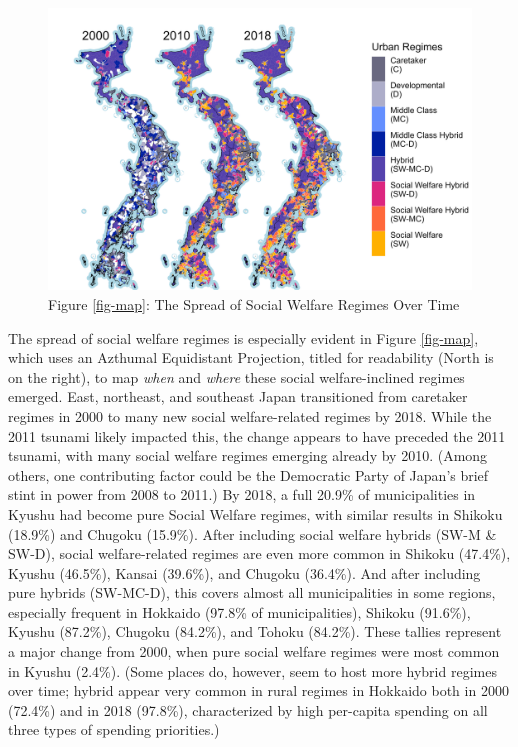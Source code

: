 \documentclass[preprint, 3p,
authoryear]{elsarticle} %
\begin{document}
\begin{figure}
\includegraphics[width=1\linewidth]{../viz/map_categories_3b} \caption{Figure \ref{fig-map}\label{fig-map}: The Spread of Social Welfare Regimes Over Time}\label{fig:map}
\end{figure}

The spread of social welfare regimes is especially evident in Figure
\ref{fig-map}, which uses an Azthumal Equidistant Projection, titled for
readability (North is on the right), to map \emph{when} and \emph{where}
these social welfare-inclined regimes emerged. East, northeast, and
southeast Japan transitioned from caretaker regimes in 2000 to many new
social welfare-related regimes by 2018. While the 2011 tsunami likely
impacted this, the change appears to have preceded the 2011 tsunami,
with many social welfare regimes emerging already by 2010. (Among
others, one contributing factor could be the Democratic Party of Japan's
brief stint in power from 2008 to 2011.) By 2018, a full 20.9\% of
municipalities in Kyushu had become pure Social Welfare regimes, with
similar results in Shikoku (18.9\%) and Chugoku (15.9\%). After
including social welfare hybrids (SW-M \& SW-D), social welfare-related
regimes are even more common in Shikoku (47.4\%), Kyushu (46.5\%),
Kansai (39.6\%), and Chugoku (36.4\%). And after including pure hybrids
(SW-MC-D), this covers almost all municipalities in some regions,
especially frequent in Hokkaido (97.8\% of municipalities), Shikoku
(91.6\%), Kyushu (87.2\%), Chugoku (84.2\%), and Tohoku (84.2\%). These
tallies represent a major change from 2000, when pure social welfare
regimes were most common in Kyushu (2.4\%). (Some places do, however,
seem to host more hybrid regimes over time; hybrid appear very common in
rural regimes in Hokkaido both in 2000 (72.4\%) and in 2018 (97.8\%),
characterized by high per-capita spending on all three types of spending
priorities.)
\end{document}
